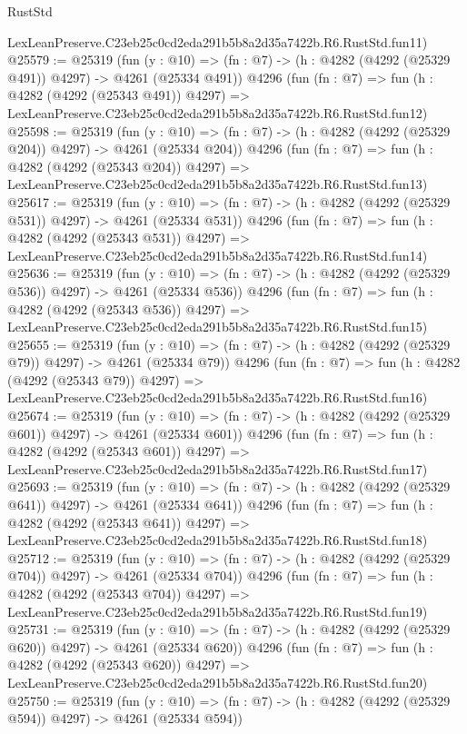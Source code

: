 \begin{lexlean}{RustStd}
\begin{coremodule}
    LexLeanPreserve.C23eb25c0cd2eda291b5b8a2d35a7422b.R6.RustStd.fun11)
@25579 := @25319
    (fun (y : @10) => (fn : @7) -> (h : @4282 (@4292 (@25329 @491)) @4297) -> @4261 (@25334 @491))
    @4296
    (fun (fn : @7) =>
    fun (h : @4282 (@4292 (@25343 @491)) @4297) =>
    LexLeanPreserve.C23eb25c0cd2eda291b5b8a2d35a7422b.R6.RustStd.fun12)
@25598 := @25319
    (fun (y : @10) => (fn : @7) -> (h : @4282 (@4292 (@25329 @204)) @4297) -> @4261 (@25334 @204))
    @4296
    (fun (fn : @7) =>
    fun (h : @4282 (@4292 (@25343 @204)) @4297) =>
    LexLeanPreserve.C23eb25c0cd2eda291b5b8a2d35a7422b.R6.RustStd.fun13)
@25617 := @25319
    (fun (y : @10) => (fn : @7) -> (h : @4282 (@4292 (@25329 @531)) @4297) -> @4261 (@25334 @531))
    @4296
    (fun (fn : @7) =>
    fun (h : @4282 (@4292 (@25343 @531)) @4297) =>
    LexLeanPreserve.C23eb25c0cd2eda291b5b8a2d35a7422b.R6.RustStd.fun14)
@25636 := @25319
    (fun (y : @10) => (fn : @7) -> (h : @4282 (@4292 (@25329 @536)) @4297) -> @4261 (@25334 @536))
    @4296
    (fun (fn : @7) =>
    fun (h : @4282 (@4292 (@25343 @536)) @4297) =>
    LexLeanPreserve.C23eb25c0cd2eda291b5b8a2d35a7422b.R6.RustStd.fun15)
@25655 := @25319
    (fun (y : @10) => (fn : @7) -> (h : @4282 (@4292 (@25329 @79)) @4297) -> @4261 (@25334 @79))
    @4296
    (fun (fn : @7) =>
    fun (h : @4282 (@4292 (@25343 @79)) @4297) =>
    LexLeanPreserve.C23eb25c0cd2eda291b5b8a2d35a7422b.R6.RustStd.fun16)
@25674 := @25319
    (fun (y : @10) => (fn : @7) -> (h : @4282 (@4292 (@25329 @601)) @4297) -> @4261 (@25334 @601))
    @4296
    (fun (fn : @7) =>
    fun (h : @4282 (@4292 (@25343 @601)) @4297) =>
    LexLeanPreserve.C23eb25c0cd2eda291b5b8a2d35a7422b.R6.RustStd.fun17)
@25693 := @25319
    (fun (y : @10) => (fn : @7) -> (h : @4282 (@4292 (@25329 @641)) @4297) -> @4261 (@25334 @641))
    @4296
    (fun (fn : @7) =>
    fun (h : @4282 (@4292 (@25343 @641)) @4297) =>
    LexLeanPreserve.C23eb25c0cd2eda291b5b8a2d35a7422b.R6.RustStd.fun18)
@25712 := @25319
    (fun (y : @10) => (fn : @7) -> (h : @4282 (@4292 (@25329 @704)) @4297) -> @4261 (@25334 @704))
    @4296
    (fun (fn : @7) =>
    fun (h : @4282 (@4292 (@25343 @704)) @4297) =>
    LexLeanPreserve.C23eb25c0cd2eda291b5b8a2d35a7422b.R6.RustStd.fun19)
@25731 := @25319
    (fun (y : @10) => (fn : @7) -> (h : @4282 (@4292 (@25329 @620)) @4297) -> @4261 (@25334 @620))
    @4296
    (fun (fn : @7) =>
    fun (h : @4282 (@4292 (@25343 @620)) @4297) =>
    LexLeanPreserve.C23eb25c0cd2eda291b5b8a2d35a7422b.R6.RustStd.fun20)
@25750 := @25319
    (fun (y : @10) => (fn : @7) -> (h : @4282 (@4292 (@25329 @594)) @4297) -> @4261 (@25334 @594))

\end{coremodule}
\end{lexlean}
